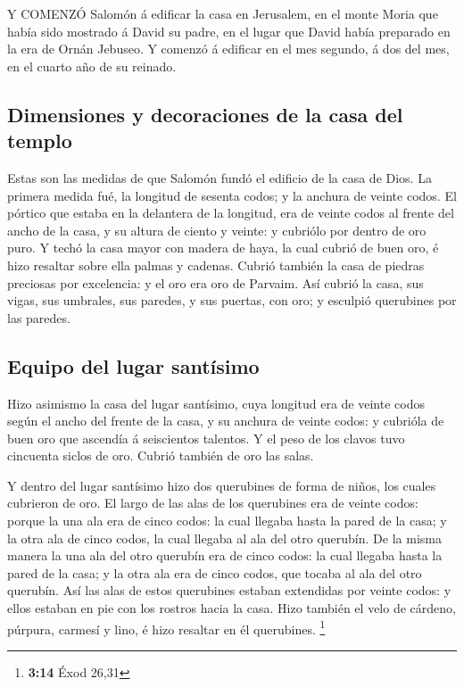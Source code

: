  Y COMENZÓ Salomón á edificar la casa en Jerusalem, en el
monte Moria que había sido mostrado á David su padre, en el lugar que
David había preparado en la era de Ornán Jebuseo.  Y comenzó
á edificar en el mes segundo, á dos del mes, en el cuarto año de su
reinado.

\hypertarget{dimensiones-y-decoraciones-de-la-casa-del-templo}{%
\subsection{Dimensiones y decoraciones de la casa del
templo}\label{dimensiones-y-decoraciones-de-la-casa-del-templo}}

 Estas son las medidas de que Salomón fundó el edificio de
la casa de Dios. La primera medida fué, la longitud de sesenta codos; y
la anchura de veinte codos.  El pórtico que estaba en la
delantera de la longitud, era de veinte codos al frente del ancho de la
casa, y su altura de ciento y veinte: y cubriólo por dentro de oro puro.
 Y techó la casa mayor con madera de haya, la cual cubrió de
buen oro, é hizo resaltar sobre ella palmas y cadenas. 
Cubrió también la casa de piedras preciosas por excelencia: y el oro era
oro de Parvaim.  Así cubrió la casa, sus vigas, sus
umbrales, sus paredes, y sus puertas, con oro; y esculpió querubines por
las paredes.

\hypertarget{equipo-del-lugar-santuxedsimo}{%
\subsection{Equipo del lugar
santísimo}\label{equipo-del-lugar-santuxedsimo}}

 Hizo asimismo la casa del lugar santísimo, cuya longitud
era de veinte codos según el ancho del frente de la casa, y su anchura
de veinte codos: y cubrióla de buen oro que ascendía á seiscientos
talentos.  Y el peso de los clavos tuvo cincuenta siclos de
oro. Cubrió también de oro las salas.

 Y dentro del lugar santísimo hizo dos querubines de forma
de niños, los cuales cubrieron de oro.  El largo de las
alas de los querubines era de veinte codos: porque la una ala era de
cinco codos: la cual llegaba hasta la pared de la casa; y la otra ala de
cinco codos, la cual llegaba al ala del otro querubín.  De
la misma manera la una ala del otro querubín era de cinco codos: la cual
llegaba hasta la pared de la casa; y la otra ala era de cinco codos, que
tocaba al ala del otro querubín.  Así las alas de estos
querubines estaban extendidas por veinte codos: y ellos estaban en pie
con los rostros hacia la casa.  Hizo también el velo de
cárdeno, púrpura, carmesí y lino, é hizo resaltar en él querubines.
\footnote{\textbf{3:14} Éxod 26,31}

